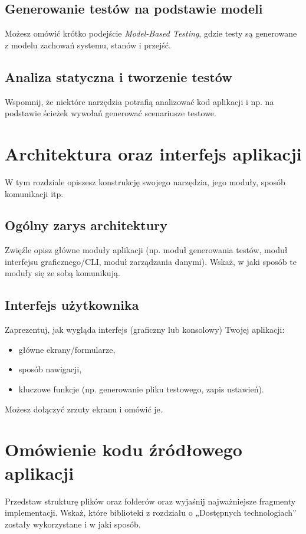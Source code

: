 \documentclass[12pt]{report}
\begin{document}
\section{Generowanie testów na podstawie modeli}
{Możesz omówić krótko podejście \emph{Model-Based Testing}, gdzie testy są generowane z modelu zachowań systemu, stanów i przejść.}

\section{Analiza statyczna i tworzenie testów}
{Wspomnij, że niektóre narzędzia potrafią analizować kod aplikacji i np. na podstawie ścieżek wywołań generować scenariusze testowe.}

\chapter{Architektura oraz interfejs aplikacji}
{W tym rozdziale opiszesz konstrukcję swojego narzędzia, jego moduły, sposób komunikacji itp.}

\section{Ogólny zarys architektury}
{Zwięźle opisz główne moduły aplikacji (np. moduł generowania testów, moduł interfejsu graficznego/CLI, moduł zarządzania danymi). Wskaż, w jaki sposób te moduły się ze sobą komunikują.}

\section{Interfejs użytkownika}
{Zaprezentuj, jak wygląda interfejs (graficzny lub konsolowy) Twojej aplikacji:
\begin{itemize}
    \item główne ekrany/formularze,
    \item sposób nawigacji,
    \item kluczowe funkcje (np. generowanie pliku testowego, zapis ustawień).
\end{itemize}
Możesz dołączyć zrzuty ekranu i omówić je.}

\chapter{Omówienie kodu źródłowego aplikacji}
{Przedstaw strukturę plików oraz folderów oraz wyjaśnij najważniejsze fragmenty implementacji. Wskaż, które biblioteki z rozdziału o „Dostępnych technologiach” zostały wykorzystane i w jaki sposób.}
\end{document}
